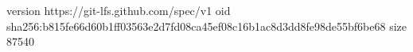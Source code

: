 version https://git-lfs.github.com/spec/v1
oid sha256:b815fe66d60b1ff03563e2d7fd08ca45ef08c16b1ac8d3dd8fe98de55bf6be68
size 87540
